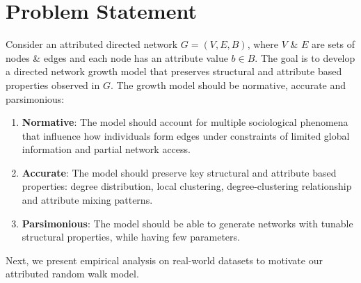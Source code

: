 
\section{Problem Statement}
\label{sec:Problem Statement}

Consider an attributed directed network $G=(V,E,B)$, where $V$ \& $E$ are
sets of nodes \& edges and each node has an attribute value $b \in B$.
The goal is to develop a directed network growth model that preserves structural
and attribute based properties observed in $G$. The growth model should be
normative, accurate and parsimonious:
\begin{enumerate}
\item \textbf{Normative}: The model should account for multiple sociological phenomena that influence how individuals form edges under constraints of limited global information and partial network access.

\item \textbf{Accurate}: The model should preserve key structural
and attribute based properties: degree distribution,
local clustering, degree-clustering relationship and attribute mixing patterns.

\item \textbf{Parsimonious}: The model should be able to
generate networks with tunable structural properties, while having few parameters.
\end{enumerate}

Next, we present empirical analysis on real-world datasets to motivate our attributed random walk model.
